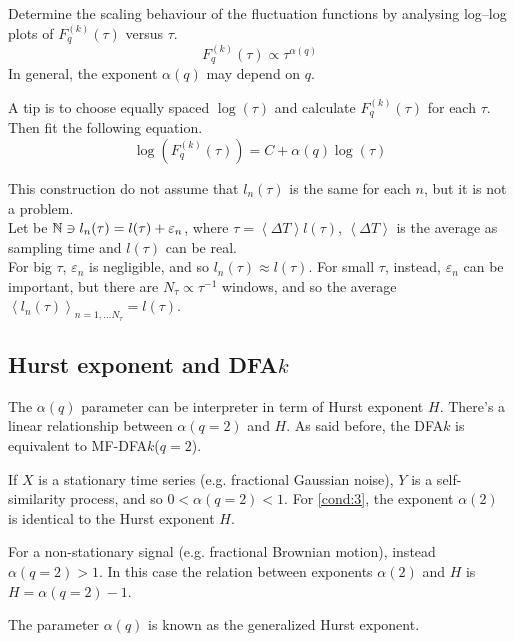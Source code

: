 \begin{step}\label{step5}
Determine the scaling behaviour of the fluctuation functions by analysing
log–log plots of $F_q^{( k )}(\tau )$ versus $\tau$.
\begin{equation*}
	F_q^{( k )}(\tau ) \propto \tau^{\alpha(q)}
\end{equation*}
In general, the exponent $\alpha(q)$ may depend on $q$. 

A tip is to choose equally spaced $\log(\tau)$ and calculate $F_q^{( k )}(\tau )$ for each $\tau$. Then fit the following equation.
\begin{equation*}
	\log(F_q^{( k )}(\tau )) = C + \alpha(q) \log(\tau)
\end{equation*}

This construction do not assume that $l_n(\tau)$ is the same for each $n$, but it is not a problem. \\
Let be $\mathbb{N} \ni l_n(\tau) = l(\tau) + \varepsilon_n$, where $\tau = \left< \Delta T\right> l(\tau)$, $\left< \Delta T\right>$ is the average as sampling time and $l(\tau)$ can be real. \\
For big $\tau$, $\varepsilon_n$ is negligible, and so $l_n(\tau) \approx l(\tau)$. For small $\tau$, instead, $\varepsilon_n$ can be important, but there are $N_{\tau} \propto \tau^{-1}$ windows, and so the average $\left< l_n(\tau) \right>_{n = 1, \dots N_{\tau}} = l(\tau)$.
\end{step}

\subsection{Hurst exponent and DFA$k$}\label{sec:hdfa}
The $\alpha(q)$ parameter can be interpreter in term of Hurst exponent $H$. There's a linear relationship between $\alpha(q=2)$ and $H$. As said before, the DFA$k$ is equivalent to MF-DFA$k$($q=2$).

If $X$ is a stationary time series (e.g. fractional Gaussian noise), $Y$ is a self-similarity process, and so $0 < \alpha(q = 2) < 1$. For \autoref{cond:3}, the exponent $\alpha(2)$ is identical to the Hurst exponent $H$.

For a non-stationary signal (e.g. fractional Brownian motion), instead $\alpha(q = 2) > 1$. In this case the relation between exponents $\alpha(2)$ and $H$ is $H = \alpha(q = 2)-1$\cite{Movahed_2006}.  

The parameter $\alpha(q)$ is known as the generalized Hurst exponent.